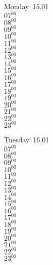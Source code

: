 \documentclass[11pt, a4paper]{book}\usepackage[]{graphicx}\usepackage[]{color}
\begin{document}
\begin{headerbox}
\end{headerbox}
\begin{weekdaybox}
  Monday~15.01\\
  { 
  \vfill
  $07^{00}$\\
$08^{00}$\\
$09^{00}$\\
$10^{00}$\\
$11^{00}$\\
$12^{00}$\\
$13^{00}$\\
$14^{00}$\\
$15^{00}$\\
$16^{00}$\\
$17^{00}$\\
$18^{00}$\\
$19^{00}$\\
$20^{00}$\\
$21^{00}$\\
$22^{00}$\\
$23^{00}$\\
  }
\end{weekdaybox}
\begin{weekdaybox}
  Tuesday~16.01\\
  { 
  \vfill
  $07^{00}$\\
$08^{00}$\\
$09^{00}$\\
$10^{00}$\\
$11^{00}$\\
$12^{00}$\\
$13^{00}$\\
$14^{00}$\\
$15^{00}$\\
$16^{00}$\\
$17^{00}$\\
$18^{00}$\\
$19^{00}$\\
$20^{00}$\\
$21^{00}$\\
$22^{00}$\\
$23^{00}$\\
  }
\end{weekdaybox}
\end{document}
